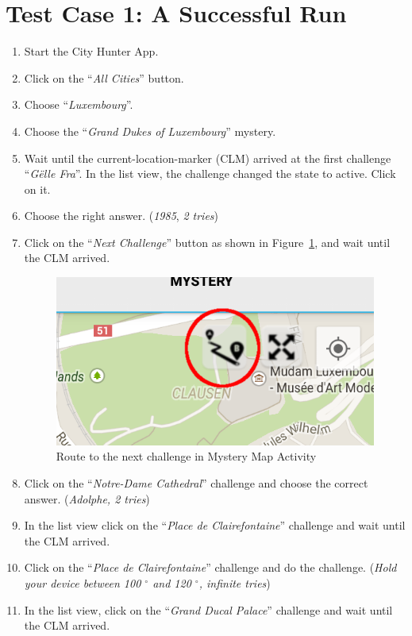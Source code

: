 \section{Test Case 1: A Successful Run}
\begin{enumerate}
	\item Start the City Hunter App.
	\item Click on the ``\emph{All Cities}'' button.
	\item Choose ``\emph{Luxembourg}''.
	\item Choose the ``\emph{Grand Dukes of Luxembourg}'' mystery.
	\item Wait until the current-location-marker (CLM) arrived at the first challenge ``\emph{G\"elle Fra}''. In the list view, the challenge changed the state to active. Click on it.
	\item Choose the right answer. (\emph{1985}, \emph{2 tries}) 
	\item Click on the ``\emph{Next Challenge}'' button as shown in Figure~\ref{fig:nextChallengeButton}, and wait until the CLM arrived.
		\begin{figure}[H]
			\centering
			\includegraphics[scale=0.4]{Figures/NextChallengeButton}
			\caption{Route to the next challenge in Mystery Map Activity}
			\label{fig:nextChallengeButton}
		\end{figure}
	\item Click on the ``\emph{Notre-Dame Cathedral}'' challenge and choose the correct answer. (\emph{Adolphe, 2 tries})
	\item In the list view click on the ``\emph{Place de Clairefontaine}'' challenge and wait until the CLM arrived.
	\item Click on the ``\emph{Place de Clairefontaine}'' challenge and do the challenge. (\emph{Hold your device between 100 $^{\circ}$ and 120 $^{\circ}$, infinite tries})
	\item In the list view, click on the ``\emph{Grand Ducal Palace}'' challenge and wait until the CLM arrived.

\end{enumerate}
